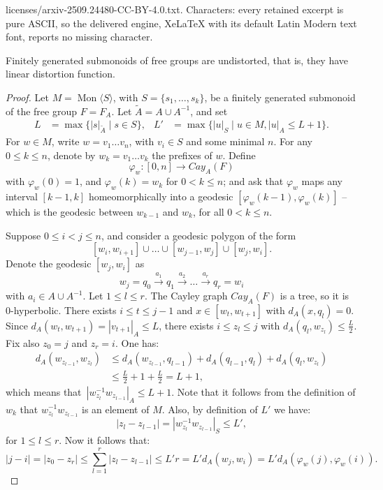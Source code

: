 \documentclass[10pt,a4paper]{amsart}
\newcommand{\Mgen}[1]{\operatorname{Mon}\bigl\langle #1 \bigr\rangle}
\begin{document}
licenses/arxiv-2509.24480-CC-BY-4.0.txt. Characters: every retained excerpt is pure ASCII, so the delivered engine, XeLaTeX with its default Latin Modern text font, reports no missing character.
\begin{lemma}\label{submonoids of free groups are un-distorted}
Finitely generated submonoids of free groups are undistorted, that is, they have linear distortion function. 
\end{lemma}

\begin{proof}
Let $M = \Mgen{S}$, with $S = \{s_1, \ldots, s_k\}$, be a finitely generated submonoid of the free group $F = F_A$.
Let $\tilde{A} = A \cup A^{-1}$, and 
set 
\begin{align*}
L & = \max\{|s|_{\tilde{A}} \mid s \in S\}, & 
L' & = \max\{|u|_S \mid u \in M, |u|_A \leq L + 1\}.
\end{align*}
For $w \in M$, write $w = v_1 \ldots v_n$, with $v_i \in S$ and some minimal $n$. For any~$0 \leq k \leq n$, denote by $w_k = v_1\ldots v_k$ the prefixes of $w$. Define
\[
\varphi_w \colon [0, n] \rightarrow Cay_A(F)
\]
with $\varphi_w(0) = 1$, and $\varphi_w(k) = w_k$ for $0 < k \leq n$; and ask that $\varphi_w$ maps any interval $[k-1, k]$ homeomorphically into a geodesic $[\varphi_w(k-1), \varphi_w(k)]$ -- which is the geodesic between $w_{k-1}$ and $w_k$, for all $0 < k \leq n$.

Suppose $0 \leq i < j \leq n$, and consider a geodesic polygon of the form 
\[
[w_i, w_{i+1}] \cup \ldots \cup [w_{j-1}, w_{j}] \cup [w_j, w_i].
\]
Denote the geodesic $[w_j, w_i]$ as 
\[
w_j = q_0 \xrightarrow{a_1} q_1 \xrightarrow{a_2} \dots \xrightarrow{a_r} q_r = w_i
\]
with $a_i \in A \cup A^{-1}$. Let $1 \leq l \leq r$. The Cayley graph $Cay_A(F)$ is a tree, so it is 0-hyperbolic.
There exists $i \leq t \leq j-1$ and $x \in [w_t, w_{t+1}]$ with $d_A(x, q_l) = 0$. Since $d_A(w_t, w_{t+1}) = |v_{t+1}|_A \leq L$, there exists $i \leq z_l \leq j$ with $d_A(q_l, w_{z_l}) \leq \frac{L}{2}$. Fix also $z_0 = j$ and $z_r = i$. One has:
\begin{align*}
d_A(w_{z_{l-1}}, w_{z_l}) & \leq d_A(w_{z_{l-1}}, q_{l-1}) + d_A(q_{l-1}, q_l) + d_A(q_l, w_{z_l}) \\
& \leq \frac{L}{2} + 1 + \frac{L}{2} = L + 1,
\end{align*}
which means that~$|w_{z_l}^{-1} w_{z_{l-1}}|_A \leq L+1$. Note that it follows from the definition of $w_k$ that $w_{z_l}^{-1} w_{z_{l-1}}$ is an element of $M$. Also, by definition of $L'$ we have:
\[
|z_l - z_{l-1}| = |w_{z_l}^{-1} w_{z_{l-1}}|_S \leq L',
\]
for $1 \leq l \leq r$. Now it follows that:
\[
|j - i| =|z_0 - z_r| \leq \sum_{l=1}^{r} |z_l - z_{l-1}| \leq L'r = L' d_A(w_j, w_i) = L' d_A(\varphi_w(j), \varphi_w(i)).
\]



\end{proof}
\end{document}
